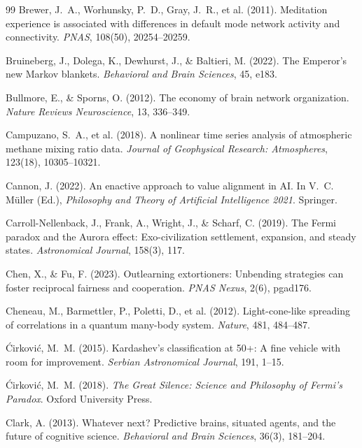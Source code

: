 \documentclass[11pt,twocolumn]{article}
\begin{document}
\begin{thebibliography}{99}
 Brewer, J.~A., Worhunsky, P.~D., Gray, J.~R., et al. (2011). Meditation experience is associated with differences in default mode network activity and connectivity. \emph{PNAS}, 108(50), 20254--20259.

 Bruineberg, J., Dolega, K., Dewhurst, J., \& Baltieri, M. (2022). The Emperor's new Markov blankets. \emph{Behavioral and Brain Sciences}, 45, e183.

 Bullmore, E., \& Sporns, O. (2012). The economy of brain network organization. \emph{Nature Reviews Neuroscience}, 13, 336--349.

 Campuzano, S.~A., et al. (2018). A nonlinear time series analysis of atmospheric methane mixing ratio data. \emph{Journal of Geophysical Research: Atmospheres}, 123(18), 10305--10321.

 Cannon, J. (2022). An enactive approach to value alignment in AI. In V.~C. Müller (Ed.), \emph{Philosophy and Theory of Artificial Intelligence 2021}. Springer.

 Carroll-Nellenback, J., Frank, A., Wright, J., \& Scharf, C. (2019). The Fermi paradox and the Aurora effect: Exo-civilization settlement, expansion, and steady states. \emph{Astronomical Journal}, 158(3), 117.

 Chen, X., \& Fu, F. (2023). Outlearning extortioners: Unbending strategies can foster reciprocal fairness and cooperation. \emph{PNAS Nexus}, 2(6), pgad176.

 Cheneau, M., Barmettler, P., Poletti, D., et al. (2012). Light-cone-like spreading of correlations in a quantum many-body system. \emph{Nature}, 481, 484--487.

 Ćirković, M.~M. (2015). Kardashev's classification at 50+: A fine vehicle with room for improvement. \emph{Serbian Astronomical Journal}, 191, 1--15.

 Ćirković, M.~M. (2018). \emph{The Great Silence: Science and Philosophy of Fermi's Paradox}. Oxford University Press.

 Clark, A. (2013). Whatever next? Predictive brains, situated agents, and the future of cognitive science. \emph{Behavioral and Brain Sciences}, 36(3), 181--204.


\end{thebibliography}
\end{document}
